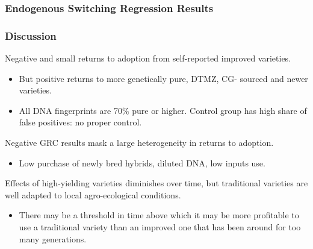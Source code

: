 \documentclass{beamer}
\begin{document}
\begin{frame}
\frametitle{Endogenous Switching Regression Results}



 
\end{frame}

\begin{frame}
\frametitle{Discussion}
Negative and small returns to adoption from self-reported improved varieties.
\begin{itemize}
    \item But positive returns to more genetically pure, DTMZ, CG- sourced and newer varieties.
    \item All DNA fingerprints are 70\% pure or higher. Control group has high share of false positives: no proper control. 
    
\end{itemize}
Negative GRC results mask a large heterogeneity in returns to adoption. 
\begin{itemize}
    \item Low purchase of newly bred hybrids, diluted DNA, low inputs use.
 
\end{itemize}  

Effects of high-yielding varieties diminishes over time, but traditional varieties are well adapted to local agro-ecological conditions.

\begin{itemize}
    \item There may be a threshold in time above which it may be more profitable to use a traditional variety than an improved one that has been around for too many generations. 

\end{itemize}


\end{frame}



\end{document}
